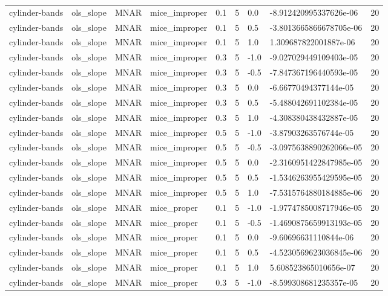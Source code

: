 \begin{tabular}{lllllllll}
cylinder-bands & ols\_slope & MNAR & mice\_improper & 0.1 & 5 & 0.0 & -8.912420995337626e-06 & 20 \\
cylinder-bands & ols\_slope & MNAR & mice\_improper & 0.1 & 5 & 0.5 & -3.8013665866678705e-06 & 20 \\
cylinder-bands & ols\_slope & MNAR & mice\_improper & 0.1 & 5 & 1.0 & 1.309687822001887e-06 & 20 \\
cylinder-bands & ols\_slope & MNAR & mice\_improper & 0.3 & 5 & -1.0 & -9.027029449109403e-05 & 20 \\
cylinder-bands & ols\_slope & MNAR & mice\_improper & 0.3 & 5 & -0.5 & -7.847367196440593e-05 & 20 \\
cylinder-bands & ols\_slope & MNAR & mice\_improper & 0.3 & 5 & 0.0 & -6.66770494377144e-05 & 20 \\
cylinder-bands & ols\_slope & MNAR & mice\_improper & 0.3 & 5 & 0.5 & -5.488042691102384e-05 & 20 \\
cylinder-bands & ols\_slope & MNAR & mice\_improper & 0.3 & 5 & 1.0 & -4.308380438432887e-05 & 20 \\
cylinder-bands & ols\_slope & MNAR & mice\_improper & 0.5 & 5 & -1.0 & -3.87903263576744e-05 & 20 \\
cylinder-bands & ols\_slope & MNAR & mice\_improper & 0.5 & 5 & -0.5 & -3.0975638890262066e-05 & 20 \\
cylinder-bands & ols\_slope & MNAR & mice\_improper & 0.5 & 5 & 0.0 & -2.3160951422847985e-05 & 20 \\
cylinder-bands & ols\_slope & MNAR & mice\_improper & 0.5 & 5 & 0.5 & -1.5346263955429595e-05 & 20 \\
cylinder-bands & ols\_slope & MNAR & mice\_improper & 0.5 & 5 & 1.0 & -7.5315764880184885e-06 & 20 \\
cylinder-bands & ols\_slope & MNAR & mice\_proper & 0.1 & 5 & -1.0 & -1.9774785008717946e-05 & 20 \\
cylinder-bands & ols\_slope & MNAR & mice\_proper & 0.1 & 5 & -0.5 & -1.4690875659913193e-05 & 20 \\
cylinder-bands & ols\_slope & MNAR & mice\_proper & 0.1 & 5 & 0.0 & -9.60696631110844e-06 & 20 \\
cylinder-bands & ols\_slope & MNAR & mice\_proper & 0.1 & 5 & 0.5 & -4.5230569623036845e-06 & 20 \\
cylinder-bands & ols\_slope & MNAR & mice\_proper & 0.1 & 5 & 1.0 & 5.608523865010656e-07 & 20 \\
cylinder-bands & ols\_slope & MNAR & mice\_proper & 0.3 & 5 & -1.0 & -8.599308681235357e-05 & 20 \\

\end{tabular}
